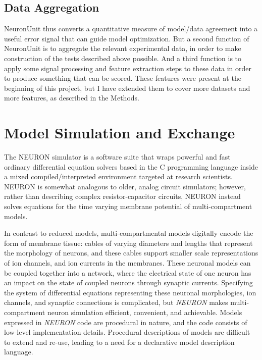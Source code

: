 \subsection{Data Aggregation}
NeuronUnit thus converts a quantitative measure of model/data agreement into a useful error signal that can guide model optimization.
But a second function of NeuronUnit is to aggregate the relevant experimental data, in order to make  construction of the tests described above possible.
And a third function is to apply some signal processing and feature extraction steps to these data in order to produce something that can be scored.
These features were present at the beginning of this project, but I have extended them to cover more datasets and more features, as described in the Methods.

\section{Model Simulation and Exchange}

The NEURON \citep{carnevale2006neuron} simulator is a software suite that wraps powerful and fast ordinary differential equation solvers based in the C programming language inside a mixed compiled/interpreted environment targeted at research scientists. NEURON is somewhat analogous to older, analog circuit simulators;
however, rather than describing complex resistor-capacitor circuits, NEURON instead solves equations for the time varying membrane potential of multi-compartment models.

In contrast to reduced models, multi-compartmental models digitally encode the form of membrane tissue: cables of varying diameters and lengths that represent the morphology of neurons, and these cables support smaller scale representations of ion channels, and ion currents in the membranes.
These neuronal models can be coupled together into a network, where the electrical state of one neuron has an impact on the state of coupled neurons through synaptic currents.
Specifying the system of differential equations representing these neuronal morphologies, ion channels, and synaptic connections is complicated, but \emph{NEURON} makes multi-compartment neuron simulation efficient, convenient, and achievable.
Models expressed in \emph{NEURON} code are procedural in nature, and the code consists of low-level implementation details.
Procedural descriptions of models are difficult to extend and re-use, leading to a need for a declarative model description language.

